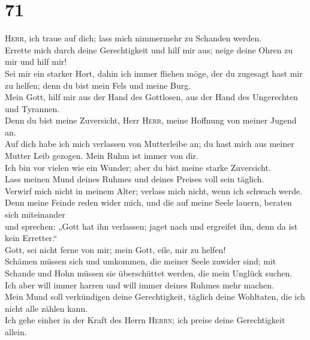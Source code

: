 \hypertarget{section-70}{%
\section{71}\label{section-70}}

 \textsc{Herr}, ich traue auf dich; lass mich nimmermehr
zu Schanden werden.\\
 Errette mich durch deine Gerechtigkeit und hilf mir aus;
neige deine Ohren zu mir und hilf mir!\\
 Sei mir ein starker Hort, dahin ich immer fliehen möge,
der du zugesagt hast mir zu helfen; denn du bist mein Fels und meine
Burg.\\
 Mein Gott, hilf mir aus der Hand des Gottlosen, aus der
Hand des Ungerechten und Tyrannen.\\
 Denn du bist meine Zuversicht, Herr \textsc{Herr}, meine
Hoffnung von meiner Jugend an.\\
 Auf dich habe ich mich verlassen von Mutterleibe an; du
hast mich aus meiner Mutter Leib gezogen. Mein Ruhm ist immer von dir.\\
 Ich bin vor vielen wie ein Wunder; aber du bist meine
starke Zuversicht.\\
 Lass meinen Mund deines Ruhmes und deines Preises voll
sein täglich.\\
 Verwirf mich nicht in meinem Alter; verlass mich nicht,
wenn ich schwach werde.\\
 Denn meine Feinde reden wider mich, und die auf meine
Seele lauern, beraten sich miteinander\\
 und sprechen: „Gott hat ihn verlassen; jaget nach und
ergreifet ihn, denn da ist kein Erretter.``\\
 Gott, sei nicht ferne von mir; mein Gott, eile, mir zu
helfen!\\
 Schämen müssen sich und umkommen, die meiner Seele
zuwider sind; mit Schande und Hohn müssen sie überschüttet werden, die
mein Unglück suchen.\\
 Ich aber will immer harren und will immer deines Ruhmes
mehr machen.\\
 Mein Mund soll verkündigen deine Gerechtigkeit, täglich
deine Wohltaten, die ich nicht alle zählen kann.\\
 Ich gehe einher in der Kraft des Herrn \textsc{Herrn};
ich preise deine Gerechtigkeit allein.\\
